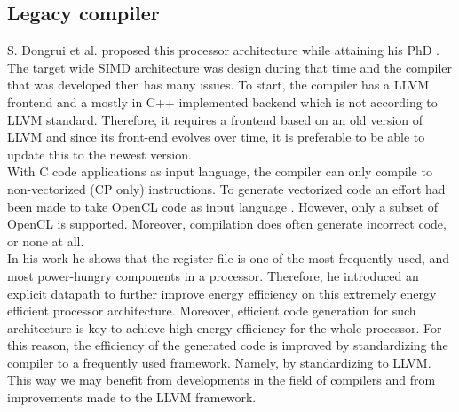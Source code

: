 

\subsection{Legacy compiler}\label{sec:legacy_comp}
S. Dongrui et al. proposed this processor architecture \cite{simd} while attaining his PhD \cite{dongrui}. The target wide SIMD architecture was design during that time and the compiler that was developed then has many issues. To start, the compiler has a LLVM frontend and a mostly in C++ implemented backend which is not according to LLVM standard. Therefore, it requires a frontend based on an old version of LLVM and since its front-end evolves over time, it is preferable to be able to update this to the newest version. \\

With C code applications as input language, the compiler can only compile to non-vectorized (CP only) instructions. To generate vectorized code an effort had been made to take OpenCL code as input language \cite{dongrio2}. However, only a subset of OpenCL is supported. Moreover, compilation does often generate incorrect code, or none at all. \\


In his work he shows that the register file is one of the most frequently used, and most power-hungry components in a processor. Therefore, he introduced an explicit datapath to further improve energy efficiency on this extremely energy efficient processor architecture. Moreover, efficient code generation for such architecture is key to achieve high energy efficiency for the whole processor. For this reason, the efficiency of the generated code is improved by standardizing the compiler to a frequently used framework. Namely, by standardizing to LLVM. This way we may benefit from developments in the field of compilers and from improvements made to the LLVM framework.

